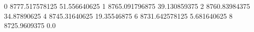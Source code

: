 0 8777.517578125 51.556640625
1 8765.091796875 39.130859375
2 8760.83984375 34.87890625
4 8745.31640625 19.35546875
6 8731.642578125 5.681640625
8 8725.9609375 0.0
